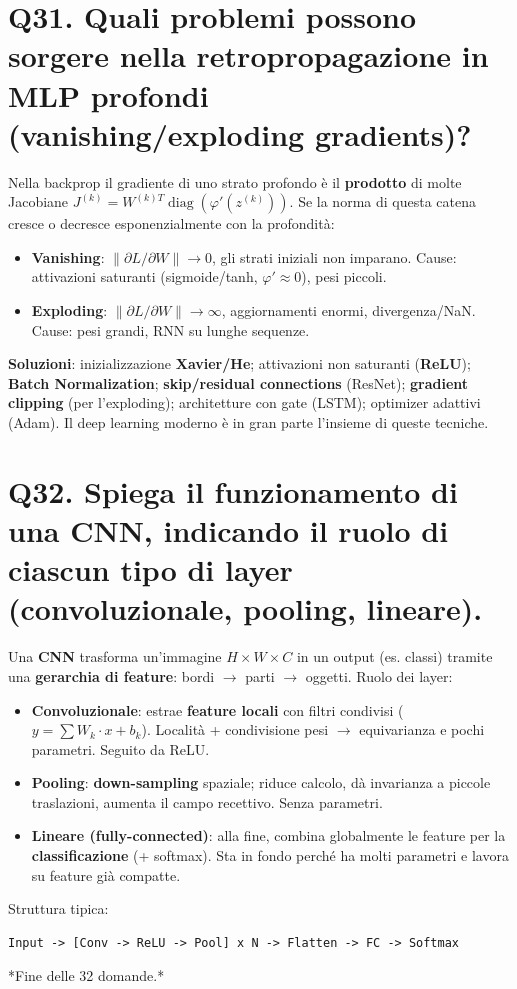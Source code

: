 \documentclass[11pt,a4paper]{article}
\begin{document}
\section*{Q31. Quali problemi possono sorgere nella retropropagazione in MLP profondi (vanishing/exploding gradients)?}
Nella backprop il gradiente di uno strato profondo è il \textbf{prodotto} di molte Jacobiane $J^{(k)} = W^{(k)T} \operatorname{diag}(\varphi '(z^{(k)}))$. Se la norma di questa catena cresce o decresce esponenzialmente con la profondità:
\begin{itemize}
\item \textbf{Vanishing}: $\|\partial L/\partial W\| \to  0$, gli strati iniziali non imparano. Cause: attivazioni saturanti (sigmoide/tanh, $\varphi '\approx 0$), pesi piccoli.
\item \textbf{Exploding}: $\|\partial L/\partial W\| \to  \infty $, aggiornamenti enormi, divergenza/NaN. Cause: pesi grandi, RNN su lunghe sequenze.
\end{itemize}
\textbf{Soluzioni}: inizializzazione \textbf{Xavier/He}; attivazioni non saturanti (\textbf{ReLU}); \textbf{Batch Normalization}; \textbf{skip/residual connections} (ResNet); \textbf{gradient clipping} (per l'exploding); architetture con gate (LSTM); optimizer adattivi (Adam). Il deep learning moderno è in gran parte l'insieme di queste tecniche.
\newpage
\section*{Q32. Spiega il funzionamento di una CNN, indicando il ruolo di ciascun tipo di layer (convoluzionale, pooling, lineare).}
Una \textbf{CNN} trasforma un'immagine $H\times W\times C$ in un output (es. classi) tramite una \textbf{gerarchia di feature}: bordi $\to $ parti $\to $ oggetti. Ruolo dei layer:
\begin{itemize}
\item \textbf{Convoluzionale}: estrae \textbf{feature locali} con filtri condivisi ($y = \sum W_k\cdot x + b_k$). Località + condivisione pesi $\to $ equivarianza e pochi parametri. Seguito da ReLU.
\item \textbf{Pooling}: \textbf{down-sampling} spaziale; riduce calcolo, dà invarianza a piccole traslazioni, aumenta il campo recettivo. Senza parametri.
\item \textbf{Lineare (fully-connected)}: alla fine, combina globalmente le feature per la \textbf{classificazione} (+ softmax). Sta in fondo perché ha molti parametri e lavora su feature già compatte.
\end{itemize}
Struttura tipica:
\begin{verbatim}
Input -> [Conv -> ReLU -> Pool] x N -> Flatten -> FC -> Softmax
\end{verbatim}
*Fine delle 32 domande.*
\end{document}
